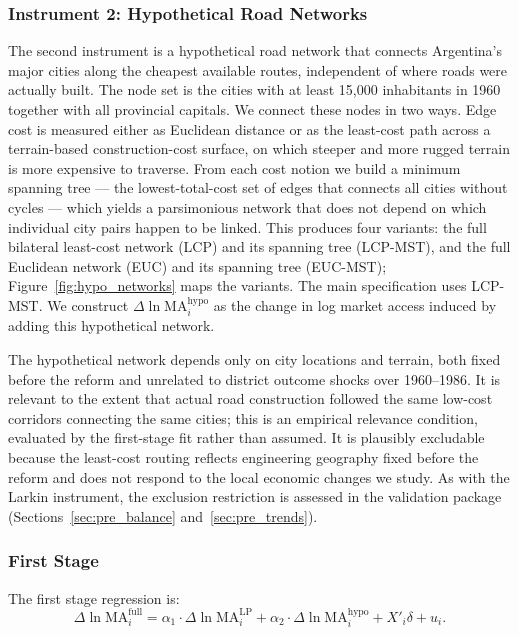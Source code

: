 \subsubsection{Instrument 2: Hypothetical Road Networks}
\label{sssec:iv_hypo}

The second instrument is a hypothetical road network that connects
Argentina's major cities along the cheapest available routes,
independent of where roads were actually built. The node set is the
cities with at least 15{,}000 inhabitants in 1960 together with all
provincial capitals. We connect these nodes in two ways. Edge cost is
measured either as Euclidean distance or as the least-cost path across
a terrain-based construction-cost surface, on which steeper and more
rugged terrain is more expensive to traverse. From each cost notion we
build a minimum spanning tree --- the lowest-total-cost set of edges
that connects all cities without cycles --- which yields a parsimonious
network that does not depend on which individual city pairs happen to
be linked. This produces four variants: the full bilateral least-cost
network (LCP) and its spanning tree (LCP-MST), and the full Euclidean
network (EUC) and its spanning tree (EUC-MST); Figure~\ref{fig:hypo_networks}
maps the variants. The main specification
uses LCP-MST. We construct $\Delta \ln \mathrm{MA}^{\mathrm{hypo}}_i$
as the change in log market access induced by adding this hypothetical
network.

The hypothetical network depends only on city locations and terrain,
both fixed before the reform and unrelated to district outcome shocks
over 1960--1986. It is relevant to the extent that actual road
construction followed the same low-cost corridors connecting the same
cities; this is an empirical relevance condition, evaluated by the
first-stage fit rather than assumed. It is plausibly excludable because
the least-cost routing reflects engineering geography fixed before the
reform and does not respond to the local economic changes we study. As
with the Larkin instrument, the exclusion restriction is assessed in
the validation package (Sections~\ref{sec:pre_balance}
and~\ref{sec:pre_trends}).

\subsubsection{First Stage}
\label{sssec:first_stage}

The first stage regression is:
\begin{equation}
\Delta \ln \mathrm{MA}^{\mathrm{full}}_i
  = \alpha_1 \cdot \Delta \ln \mathrm{MA}^{\mathrm{LP}}_i
  + \alpha_2 \cdot \Delta \ln \mathrm{MA}^{\mathrm{hypo}}_i
  + X'_i \delta + u_i.
\label{eq:first_stage}
\end{equation}

